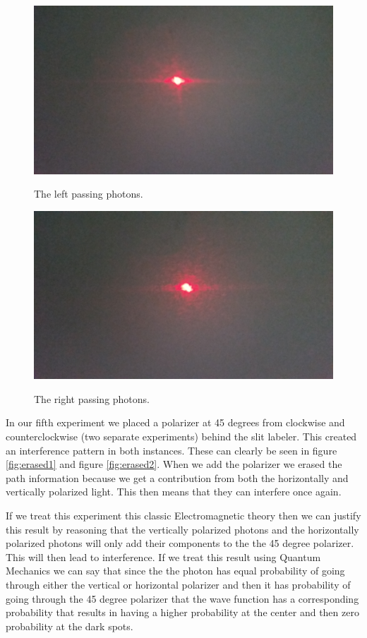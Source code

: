 \documentclass[12pt letterpaper]{article}
\begin{document}
\begin{figure}[H]
  \caption{The left passing photons.}
  \centering
    \includegraphics[width=.75\textwidth]{left_photons.jpg}
    \label{fig:left photons}
\end{figure}

\begin{figure}[H]
  \caption{The right passing photons.}
  \centering
    \includegraphics[width=.75\textwidth]{right_photons.jpg}
    \label{fig:right photons}
\end{figure}

In our fifth experiment we placed a polarizer at 45 degrees from clockwise and counterclockwise (two separate experiments) behind the slit labeler. This created an interference pattern in both instances. These can clearly be seen in figure \ref{fig:erased1} and figure \ref{fig:erased2}. When we add the polarizer we erased the path information because we get a contribution from both the horizontally and vertically polarized light. This then means that they can interfere once again. 

If we treat this experiment this classic Electromagnetic theory then we can justify this result by reasoning that the vertically polarized photons and the horizontally polarized photons will only add their components to the the 45 degree polarizer. This will then lead to interference. If we treat this result using Quantum Mechanics we can say that since the the photon has equal probability of going through either the vertical or horizontal polarizer and then it has probability of going through the 45 degree polarizer that the wave function has a corresponding probability that results in having a higher probability at the center and then zero probability at the dark spots. 
\end{document}
